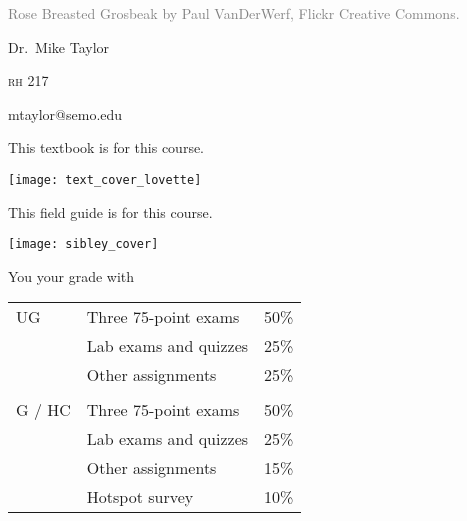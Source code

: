 \documentclass[t]{beamer}
\begin{document}


{
\begin{frame}[b,plain]
	\tiny\textcolor{gray}{Rose Breasted Grosbeak by Paul VanDerWerf, Flickr Creative Commons.}
\end{frame}
}

{
\begin{frame}[t]
	\large
	\vspace{2ex}
	\hangpara\hspace{15em} Dr.~Mike Taylor

	\hangpara\hspace{15em} \textsc{rh} 217

	\hangpara\hspace{15em} mtaylor@semo.edu
	
\end{frame}
}


\begin{frame}[t,plain]{This textbook is  for this course.}
	\begin{center}
		\vspace{-\baselineskip}
		\texttt{[image: text\_cover\_lovette]}
	\end{center}
\end{frame}

\begin{frame}[t,plain]{This field guide is  for this course.}
	\begin{center}
		\vspace{-\baselineskip}
		\texttt{[image: sibley\_cover]}
	\end{center}
\end{frame}


\begin{frame}[t]{You  your grade with}
	\begin{center}\large\begin{tabular}{@{}lll@{}}
	UG		&	Three 75-point exams 				& 	50\% \\
			&	Lab exams and quizzes	  &   25\% \\
			&	Other assignments							& 	25\% \\
			&										&	\\
	G / HC	&	Three 75-point exams 			& 	50\% \\
			&	Lab exams and quizzes		&   25\% \\
			&	Other assignments					 		&		15\% \\
			&	Hotspot survey 								&		10\% \\
		\end{tabular}
	\end{center}


\end{frame}
\end{document}
